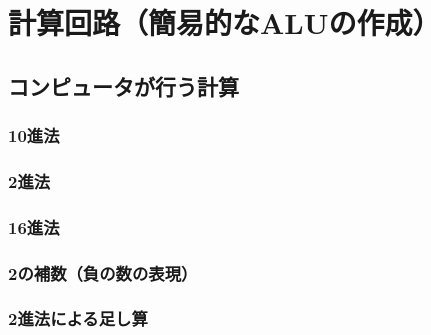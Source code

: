     \section{計算回路（簡易的なALUの作成）}
    \subsection{コンピュータが行う計算}
        \subsubsection{10進法}

        \subsubsection{2進法}

        \subsubsection{16進法}

        \subsubsection{2の補数（負の数の表現）}

        \subsubsection{2進法による足し算}

